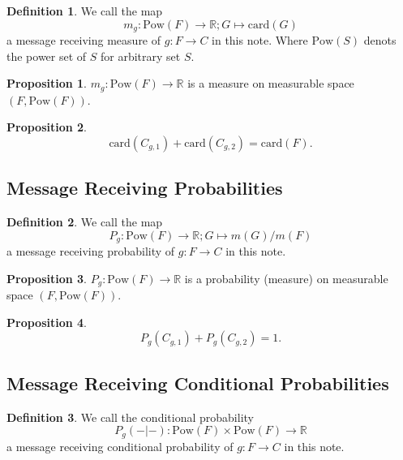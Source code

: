 \documentclass[11pt, a4note]{article}
\theoremstyle{definition}
\newtheorem{definition}{Definition}[section]
\newtheorem{proposition}{Proposition}[section]
\begin{document}
\begin{definition}
We call the map
\begin{equation}
m_{g} : \mathrm{Pow}(F) \to \mathbb{R} ; G \mapsto \mathrm{card}(G)
\end{equation}
a message receiving measure of $ g : F \to C $ in this note.
Where $ \mathrm{Pow}(S) $ denots the power set of $ S $ for arbitrary set $ S $.
\end{definition}

\begin{proposition}
$ m_{g} : \mathrm{Pow}(F) \to \mathbb{R} $ is a measure on measurable space $ (F, \mathrm{Pow}(F)) $.
\end{proposition}

\begin{proposition}
\begin{equation}
\mathrm{card}(C_{g,1}) + \mathrm{card}(C_{g,2}) = \mathrm{card}(F).
\end{equation}
\end{proposition}

\subsection{Message Receiving Probabilities}

\begin{definition}
We call the map
\begin{equation}
P_{g} : \mathrm{Pow}(F) \to \mathbb{R} ; G \mapsto m(G)/m(F)
\end{equation}
a message receiving probability of $ g : F \to C $ in this note.
\end{definition}

\begin{proposition}
$ P_{g} : \mathrm{Pow}(F) \to \mathbb{R} $ is a probability (measure) on measurable space $ (F, \mathrm{Pow}(F)) $.
\end{proposition}

\begin{proposition}
\begin{equation}
P_{g}(C_{g,1}) + P_{g}(C_{g,2}) = 1.
\end{equation}
\end{proposition}

\subsection{Message Receiving Conditional Probabilities}

\begin{definition}
We call the conditional probability 
\begin{equation}
P_{g}(-|-): \mathrm{Pow}(F) \times \mathrm{Pow}(F) \to \mathbb{R}
\end{equation}
a message receiving conditional probability of $ g : F \to C $ in this note.
\end{definition}
\end{document}

